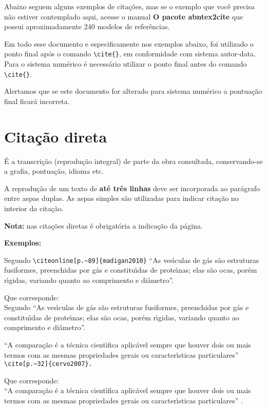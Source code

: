 Abaixo seguem alguns exemplos de cita\c{c}\~oes, mas se o exemplo que voc\^e precisa n\~ao estiver contemplado aqui, acesse o manual \textbf{O pacote abntex2cite} que possui aproximadamente 240 modelos de refer\^encias.

Em todo esse documento e especificamente nos exemplos abaixo, foi utilizado o ponto final ap\'os o comando \verb+\cite{}+, em conformidade com sistema autor-data. Para o sistema num\'erico \'e necess\'ario utilizar o ponto final antes do comando \verb+\cite{}+. 

Alertamos que se este documento for alterado para sistema num\'erico a pontua\c{c}\~ao final ficar\'a incorreta. 

\section{Cita\c{c}\~ao direta}

\'E a transcri\c{c}\~ao (reprodu\c{c}\~ao integral) de parte da obra consultada, conservando-se a grafia, pontua\c{c}\~ao, idioma etc.

A reprodu\c{c}\~ao de um texto de \textbf{at\'e tr\^es linhas} deve ser incorporada ao par\'agrafo entre aspas duplas. As aspas simples s\~ao utilizadas para indicar cita\c{c}\~ao no interior da cita\c{c}\~ao.

\textbf{Nota:} nas cita\c{c}\~oes diretas \'e obrigat\'oria a indica\c{c}\~ao da p\'agina.

\textbf{Exemplos: }

\begin{alineas} 
\item 

Segundo \verb+\citeonline[p.~89]{madigan2010}+ “As ves\'{\i}culas de g\'as s\~ao estruturas fusiformes, preenchidas por g\'as e constitu\'{\i}das de prote\'{\i}nas; elas s\~ao ocas, por\'em r\'{\i}gidas, variando quanto ao comprimento e di\^ametro”.

Que corresponde: \\
Segundo  “As ves\'{\i}culas de g\'as s\~ao estruturas
fusiformes, preenchidas por g\'as e constitu\'{\i}das de prote\'{\i}nas; elas s\~ao ocas, por\'em
r\'{\i}gidas, variando quanto ao comprimento e di\^ametro”.

\item 

“A compara\c{c}\~ao \'e a t\'ecnica cient\'{\i}fica aplic\'avel sempre que houver dois ou
mais termos com as mesmas propriedades gerais ou caracter\'{\i}sticas particulares”  \verb+\cite[p.~32]{cervo2007}.+

Que corresponde: \\
“A compara\c{c}\~ao \'e a t\'ecnica cient\'{\i}fica aplic\'avel sempre que houver dois ou
mais termos com as mesmas propriedades gerais ou caracter\'{\i}sticas particulares” \cite[p.~32]{cervo2007}.

\end{alineas}

